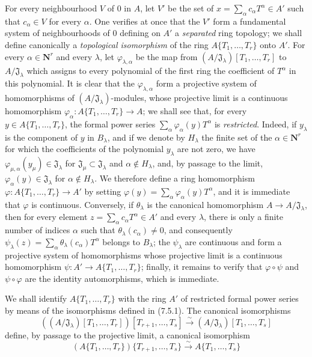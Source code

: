 \begin{env}[7.5.1]
For every neighbourhood $V$ of $0$ in $A$, let $V'$ be the set of
$x=\sum_\alpha c_\alpha T^\alpha\in A'$ such that $c_\alpha\in V$ for every
$\alpha$. One verifies at once that the $V'$ form a fundamental system of
neighbourhoods of $0$ defining on $A'$ a \emph{separated} ring topology;
we shall define canonically a \emph{topological isomorphism} of
the ring $A\{T_1,\ldots,T_r\}$ onto $A'$. For every
$\alpha\in\mathbf{N}^r$ and every $\lambda$, let
$\varphi_{\lambda,\alpha}$ be the map from
$(A/\mathfrak J_\lambda)[T_1,\ldots,T_r]$ to
$A/\mathfrak J_\lambda$ which assigns to every polynomial of the first ring
the coefficient of $T^\alpha$ in this polynomial. It is clear that
the $\varphi_{\lambda,\alpha}$ form a projective system of homomorphisms
of $(A/\mathfrak J_\lambda)$-modules, whose projective limit is a
continuous homomorphism
$\varphi_\alpha:A\{T_1,\ldots,T_r\}\to A$; we shall see that, for every
$y\in A\{T_1,\ldots,T_r\}$, the formal power series
$\sum_\alpha\varphi_\alpha(y)T^\alpha$ is \emph{restricted}. Indeed, if
$y_\lambda$ is the component of $y$ in $B_\lambda$, and if we denote by
$H_\lambda$ the finite set of the $\alpha\in\mathbf{N}^r$ for which the
coefficients of the polynomial $y_\lambda$ are not zero, we have
$\varphi_{\mu,\alpha}(y_\mu)\in\mathfrak J_\lambda$ for
$\mathfrak J_\mu\subset\mathfrak J_\lambda$ and $\alpha\notin H_\lambda$, and,
by passage to the limit, $\varphi_\alpha(y)\in\mathfrak J_\lambda$ for
$\alpha\notin H_\lambda$. We therefore define a ring homomorphism
$\varphi:A\{T_1,\ldots,T_r\}\to A'$ by setting
$\varphi(y)=\sum_\alpha\varphi_\alpha(y)T^\alpha$, and it is immediate that
$\varphi$ is continuous. Conversely, if $\theta_\lambda$ is the canonical
homomorphism $A\to A/\mathfrak J_\lambda$, then for every element
$z=\sum_\alpha c_\alpha T^\alpha\in A'$ and every $\lambda$, there is only a
finite number of indices $\alpha$ such that $\theta_\lambda(c_\alpha)\neq0$, and
consequently
$\psi_\lambda(z)=\sum_\alpha\theta_\lambda(c_\alpha)T^\alpha$ belongs to
$B_\lambda$; the $\psi_\lambda$ are continuous and form a projective
system of homomorphisms whose projective limit is a continuous
homomorphism $\psi:A'\to A\{T_1,\ldots,T_r\}$; finally, it remains to verify that
$\varphi\circ\psi$ and $\psi\circ\varphi$ are the identity automorphisms,
which is immediate.
\end{env}

\begin{env}[7.5.2]
\label{0.7.5.2}
We shall identify $A\{T_1,\ldots,T_r\}$ with the ring $A'$ of restricted formal
power series by means of the isomorphisms defined in (7.5.1). The canonical
isomorphisms
\[
  ((A/\mathfrak J_\lambda)[T_1,\ldots,T_r])
  [T_{r+1},\ldots,T_s]
  \xrightarrow{\sim}
  (A/\mathfrak J_\lambda)[T_1,\ldots,T_s]
\]
define, by passage to the projective limit, a canonical isomorphism
\[
  (A\{T_1,\ldots,T_r\})\{T_{r+1},\ldots,T_s\}
  \xrightarrow{\sim}
  A\{T_1,\ldots,T_s\}
\]
\end{env}

